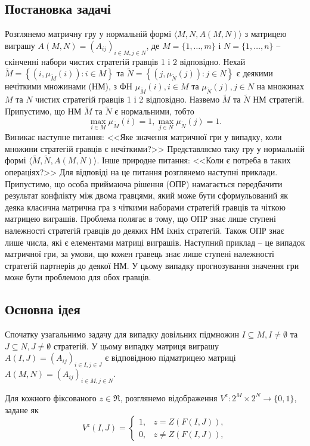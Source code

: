 \documentclass[14pt, a4paper, oneside]{extarticle}
\numberwithin{equation}{section}
\begin{document}
\subsection{Постановка задачі}
Розглянемо матричну гру у нормальній формі $\langle M, N, A(M, N)\rangle$ з матрицею виграшу $A(M, N)=\left(A_{i j}\right)_{i \in M, j \in N}$, де $M=\{1, \ldots, m\}$ і $N= \{1, \ldots, n\}$ -- скінченні набори чистих стратегій гравців 1 і 2 відповідно. Нехай $\tilde{M}=\left\{\left(i, \mu_{\tilde{M}}(i)\right): i \in M\right\}$ та $\tilde{N}=\left\{\left(j, \mu_{\tilde{N}}(j)\right): j \in N\right\}$ є деякими нечіткими множинами (НМ), з ФН $\mu_{\tilde{M}}(i), i \in M$ та $\mu_{\tilde{N}}(j), j \in N$ на множинах $M$ та $N$ чистих стратегій гравців 1 і 2 відповідно. Назвемо $\tilde{M}$ та $\tilde{N}$ НМ стратегій. Припустимо, що НМ $\tilde{M}$ та $\tilde{N}$ є нормальними, тобто
\begin{equation*}
\max _{i \in M} \mu_{\tilde{M}}(i)=1, \max _{j \in N} \mu_{\tilde{N}}(j)=1.
\end{equation*}
Виникає наступне питання: <<Яке значення матричної гри у випадку, коли множини стратегій гравців є нечіткими?>> Представляємо таку гру у нормальній формі $\langle\tilde{M}, \tilde{N}, A(M, N)\rangle$. Інше природне питання: <<Коли є потреба в таких операціях?>> Для відповіді на це питання розглянемо наступні приклади. Припустимо, що особа приймаюча рішення (ОПР) намагається передбачити результат конфлікту між двома гравцями, який може бути сформульований як деяка класична матрична гра з чіткими наборами стратегій гравців та чіткою матрицею виграшів. Проблема полягає в тому, що ОПР знає лише ступені належності стратегій гравців до деяких НМ їхніх стратегій. Також ОПР знає лише числа, які є елементами матриці виграшів. Наступний приклад -- це випадок матричної гри, за умови, що кожен гравець знає лише ступені належності стратегій партнерів до деякої НМ. У цьому випадку прогнозування значення гри може бути проблемою для обох гравців.


\subsection{Основна ідея}
Спочатку узагальнимо задачу для випадку довільних підмножин $I \subseteq M, I \neq \emptyset$ та $J \subseteq N, J \neq \emptyset$ стратегій. У цьому випадку матриця виграшу $A(I, J)=\left(A_{i j}\right)_{i \in I, j \in J}$ є відповідною підматрицею матриці $A(M, N)=\left(A_{i j}\right)_{i \in M, j \in N}$.

Для кожного фіксованого $z \in \Re$, розглянемо відображення $V^{z}: 2^{M} \times 2^{N} \rightarrow\{0,1\}$, задане як
\begin{equation}\label{formul}
V^{z}(I, J) = 
\begin{cases} 
1, & z = Z(F(I, J)), \\
0, & z \neq Z(F(I, J)),
\end{cases}
\end{equation}
\end{document}

